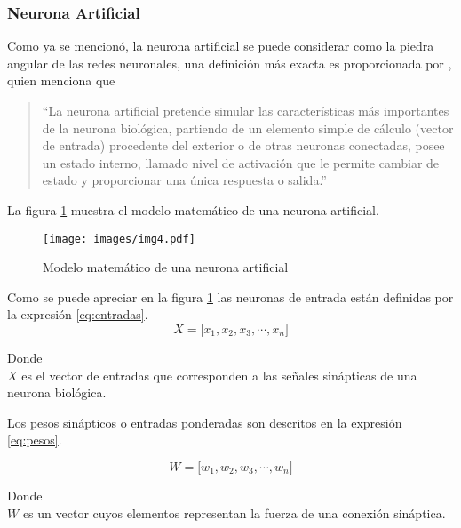     \subsubsection{Neurona Artificial}
    Como ya se mencionó, la neurona artificial se puede considerar como la piedra angular de las redes neuronales, una definición más exacta es proporcionada por \citet[p. 13]{bib13}, quien menciona que 
    \begin{quote}
        ``La neurona artificial pretende simular las características más importantes de la neurona biológica, partiendo de un elemento simple de cálculo (vector de entrada) procedente del exterior o de otras neuronas conectadas, posee un estado interno, llamado nivel de activación que le permite cambiar de estado y proporcionar una única respuesta o salida.''
    \end{quote}

    La figura \ref{fig:neuron_art} muestra el modelo matemático de una neurona artificial.

    \begin{figure}[!ht]
        \centering
        \texttt{[image: images/img4.pdf]}
        \caption{Modelo matemático de una neurona artificial}
        \label{fig:neuron_art}
    \end{figure}

    Como se puede apreciar en la figura \ref{fig:neuron_art} las neuronas de entrada están definidas por la expresión \ref{eq:entradas}.\\

    \begin{equation}
        X = \lbrack x_1, x_2, x_3, \cdots, x_n \rbrack
        \label{eq:entradas}
    \end{equation}

    Donde\\
    \noindent
    $X$ es el vector de entradas que corresponden a las señales sinápticas de una neurona biológica.

    Los pesos sinápticos o entradas ponderadas son descritos en la expresión \ref{eq:pesos}.

    \begin{equation}
        W = \lbrack w_1, w_2, w_3, \cdots, w_n \rbrack
        \label{eq:pesos}
    \end{equation}

    Donde\\
    \noindent
    $W$ es un vector cuyos elementos representan la fuerza de una conexión sináptica.\\


